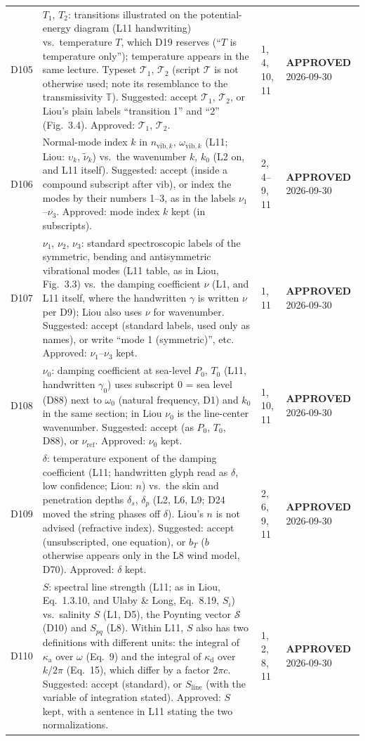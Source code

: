 \documentclass[11pt, oneside]{article}
\newcommand{\approved}{\textbf{APPROVED}}
\begin{document}
\begin{longtable}{l >{\raggedright\arraybackslash}p{} l l}
D105 & $T_1$, $T_2$: transitions illustrated on the potential-energy diagram (L11 handwriting) vs.\ temperature $T$, which D19 reserves (``$T$ is temperature only''); temperature appears in the same lecture. Typeset $\mathcal{T}_1$, $\mathcal{T}_2$ (script $\mathcal{T}$ is not otherwise used; note its resemblance to the transmissivity $\mathbb{T}$). Suggested: accept $\mathcal{T}_1$, $\mathcal{T}_2$, or Liou's plain labels ``transition 1'' and ``2'' (Fig.~3.4). Approved: $\mathcal{T}_1$, $\mathcal{T}_2$. & 1, 4, 10, 11 & \approved{} 2026-09-30 \\
D106 & Normal-mode index $k$ in $n_{\mathrm{vib},k}$, $\omega_{\mathrm{vib},k}$ (L11; Liou: $\upsilon_k$, $\tilde{\nu}_k$) vs.\ the wavenumber $k$, $k_0$ (L2 on, and L11 itself). Suggested: accept (inside a compound subscript after vib), or index the modes by their numbers 1--3, as in the labels $\nu_1$--$\nu_3$. Approved: mode index $k$ kept (in subscripts). & 2, 4--9, 11 & \approved{} 2026-09-30 \\
D107 & $\nu_1$, $\nu_2$, $\nu_3$: standard spectroscopic labels of the symmetric, bending and antisymmetric vibrational modes (L11 table, as in Liou, Fig.~3.3) vs.\ the damping coefficient $\nu$ (L1, and L11 itself, where the handwritten $\gamma$ is written $\nu$ per D9); Liou also uses $\nu$ for wavenumber. Suggested: accept (standard labels, used only as names), or write ``mode 1 (symmetric)'', etc. Approved: $\nu_1$--$\nu_3$ kept. & 1, 11 & \approved{} 2026-09-30 \\
D108 & $\nu_0$: damping coefficient at sea-level $P_0$, $T_0$ (L11, handwritten $\gamma_0$) uses subscript 0 = sea level (D88) next to $\omega_0$ (natural frequency, D1) and $k_0$ in the same section; in Liou $\nu_0$ is the line-center wavenumber. Suggested: accept (as $P_0$, $T_0$, D88), or $\nu_\mathrm{ref}$. Approved: $\nu_0$ kept. & 1, 10, 11 & \approved{} 2026-09-30 \\
D109 & $\delta$: temperature exponent of the damping coefficient (L11; handwritten glyph read as $\delta$, low confidence; Liou: $n$) vs.\ the skin and penetration depths $\delta_s$, $\delta_p$ (L2, L6, L9; D24 moved the string phases off $\delta$). Liou's $n$ is not advised (refractive index). Suggested: accept (unsubscripted, one equation), or $b_T$ ($b$ otherwise appears only in the L8 wind model, D70). Approved: $\delta$ kept. & 2, 6, 9, 11 & \approved{} 2026-09-30 \\
D110 & $S$: spectral line strength (L11; as in Liou, Eq.~1.3.10, and Ulaby \& Long, Eq.~8.19, $S_i$) vs.\ salinity $S$ (L1, D5), the Poynting vector $\boldsymbol{\mathcal{S}}$ (D10) and $S_{pq}$ (L8). Within L11, $S$ also has two definitions with different units: the integral of $\kappa_\mathrm{a}$ over $\omega$ (Eq.~9) and the integral of $\kappa_\mathrm{d}$ over $k/2\pi$ (Eq.~15), which differ by a factor $2\pi c$. Suggested: accept (standard), or $S_\mathrm{line}$ (with the variable of integration stated). Approved: $S$ kept, with a sentence in L11 stating the two normalizations. & 1, 2, 8, 11 & \approved{} 2026-09-30 \\

\end{longtable}
\end{document}
